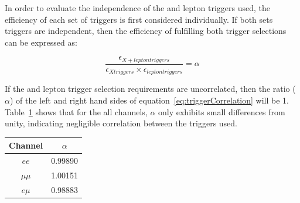 In order to evaluate the independence of the \MET and lepton triggers used, the efficiency of each set of triggers is first considered individually.
If both sets triggers are independent, then the efficiency of fulfilling both trigger selections can be expressed as:

\begin{equation}
\frac{\epsilon_{X + lepton triggers}}{\epsilon_{X triggers} \times \epsilon_{lepton triggers}} = \alpha
\label{eq:triggerCorrelation}
\end{equation}

If the \MET and lepton trigger selection requirements are uncorrelated, then the ratio ($\alpha$) of the left and right hand sides of equation~\ref{eq:triggerCorrelation} will be 1.
Table~\ref{tab:triggerCorrelation} shows that for the all channels, $\alpha$ only exhibits small differences from unity, indicating negligible correlation between the triggers used.

\begin{table}[htbp]
\label{tab:triggerCorrelation}
  \centering
 \begin{tabular}{cc}
   \hline
   \textbf{Channel} & \textbf{$\alpha$}   \\
   \hline   
   $ee$ & 0.99890 \\
   $\mu\mu$ & 1.00151  \\
   $e \mu$ & 0.98883  \\
   \hline
 \end{tabular}%
\end{table}

%

